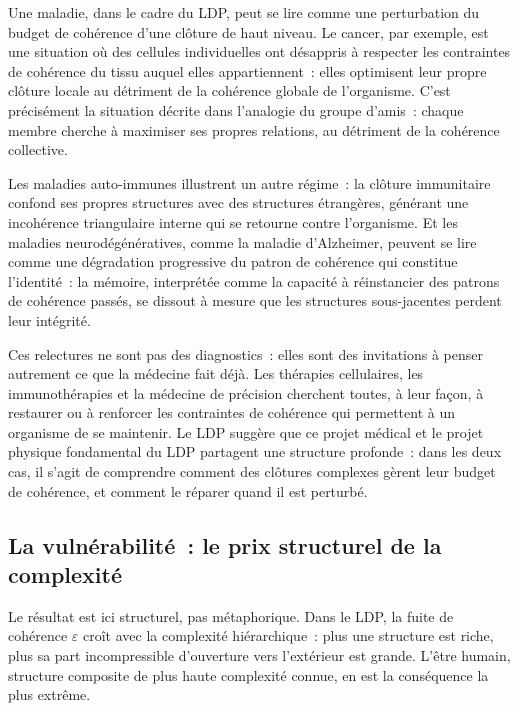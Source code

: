 \documentclass[12pt, a4paper, openright]{book}
\begin{document}
\medskip

Une maladie, dans le cadre du LDP, peut se lire comme une perturbation du budget de cohérence d'une clôture de haut niveau. Le cancer, par exemple, est une situation où des cellules individuelles ont \og désappris\fg{} à respecter les contraintes de cohérence du tissu auquel elles appartiennent~: elles optimisent leur propre clôture locale au détriment de la cohérence globale de l'organisme. C'est précisément la situation décrite dans l'analogie du groupe d'amis~: chaque membre cherche à maximiser ses propres relations, au détriment de la cohérence collective.

\medskip

Les maladies auto-immunes illustrent un autre régime~: la clôture immunitaire confond ses propres structures avec des structures étrangères, générant une incohérence triangulaire interne qui se retourne contre l'organisme. Et les maladies neurodégénératives, comme la maladie d'Alzheimer, peuvent se lire comme une dégradation progressive du patron de cohérence qui constitue l'identité~: la mémoire, interprétée comme la capacité à réinstancier des patrons de cohérence passés, se dissout à mesure que les structures sous-jacentes perdent leur intégrité.

\medskip

Ces relectures ne sont pas des diagnostics~: elles sont des invitations à penser autrement ce que la médecine fait déjà. Les thérapies cellulaires, les immunothérapies et la médecine de précision cherchent toutes, à leur façon, à restaurer ou à renforcer les contraintes de cohérence qui permettent à un organisme de se maintenir. Le LDP suggère que ce projet médical et le projet physique fondamental du LDP partagent une structure profonde~: dans les deux cas, il s'agit de comprendre comment des clôtures complexes gèrent leur budget de cohérence, et comment le réparer quand il est perturbé.

\subsection*{La vulnérabilité~: le prix structurel de la complexité}

Le résultat est ici structurel, pas métaphorique. Dans le LDP, la fuite de cohérence $\varepsilon$ croît avec la complexité hiérarchique~: plus une structure est riche, plus sa part incompressible d'ouverture vers l'extérieur est grande. L'être humain, structure composite de plus haute complexité connue, en est la conséquence la plus extrême.
\end{document}
